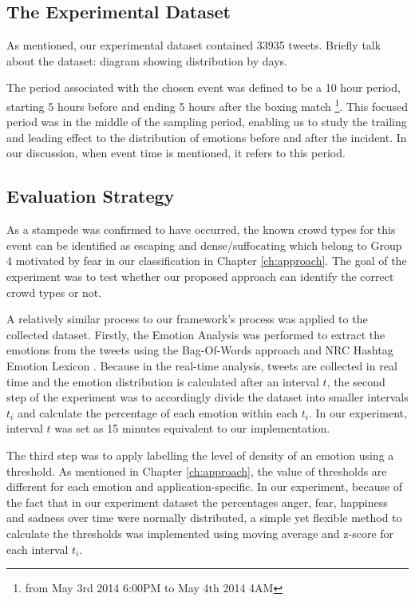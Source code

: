 \subsection{The Experimental Dataset}
As mentioned, our experimental dataset contained 33935 tweets. Briefly talk about the dataset: diagram showing distribution by days.

The period associated with the chosen event was defined to be a 10 hour period, starting 5 hours before and ending 5 hours after the boxing match \footnote{from May 3rd 2014 6:00PM to May 4th 2014 4AM}. This focused period was in the middle of the sampling period, enabling us to study the trailing and leading effect to the distribution of emotions before and after the incident. In our discussion, when event time is mentioned, it refers to this period.

\subsection{Evaluation Strategy}
As a stampede was confirmed to have occurred, the known crowd types for this event can be identified as escaping and dense/suffocating which belong to Group 4 motivated by fear in our classification in Chapter \ref{ch:approach}. The goal of the experiment was to test whether our proposed approach can identify the correct crowd types or not.

A relatively similar process to our framework's process was applied to the collected dataset. Firstly, the Emotion Analysis was performed to extract the emotions from the tweets using the Bag-Of-Words approach and NRC Hashtag Emotion Lexicon \citep{mohammad2014using}. Because in the real-time analysis, tweets are collected in real time and the emotion distribution is calculated after an interval \(t\), the second step of the experiment was to accordingly divide the dataset into smaller intervals \(t_i\) and calculate the percentage of each emotion within each \(t_i\). In our experiment, interval \(t\) was set as 15 minutes equivalent to our implementation.

The third step was to apply labelling the level of density of an emotion using a threshold. As mentioned in Chapter \ref{ch:approach}, the value of thresholds are different for each emotion and application-specific. In our experiment, because of the fact that in our experiment dataset the percentages anger, fear, happiness and sadness over time were normally distributed, a simple yet flexible method to calculate the thresholds was implemented using moving average and z-score for each interval \(t_i\).

